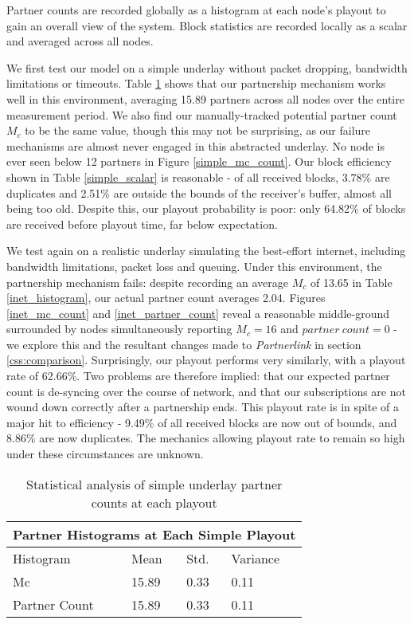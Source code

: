 \documentclass[12pt,a4paper]{article}
\begin{document}
Partner counts are recorded globally as a histogram at each node's playout to gain an overall view of the system. Block statistics are recorded locally as a scalar and averaged across all nodes.

We first test our model on a simple underlay without packet dropping, bandwidth limitations or timeouts. Table \ref{simple_histogram} shows that our partnership mechanism works well in this environment, averaging 15.89 partners across all nodes over the entire measurement period. We also find our manually-tracked potential partner count \(M_c\) to be the same value, though this may not be surprising, as our failure mechanisms are almost never engaged in this abstracted underlay. No node is ever seen below 12 partners in Figure \ref{simple_mc_count}. Our block efficiency shown in Table \ref{simple_scalar} is reasonable - of all received blocks, 3.78\% are duplicates and 2.51\% are outside the bounds of the receiver's buffer, almost all being too old. Despite this, our playout probability is poor: only 64.82\% of blocks are received before playout time, far below expectation.

We test again on a realistic underlay simulating the best-effort internet, including bandwidth limitations, packet loss and queuing. Under this environment, the partnership mechanism fails: despite recording an average \(M_c\) of 13.65 in Table \ref{inet_histogram}, our actual partner count averages 2.04. Figures \ref{inet_mc_count} and \ref{inet_partner_count} reveal a reasonable middle-ground surrounded by nodes simultaneously reporting \(M_c = 16\) and \(partner\ count = 0\) - we explore this and the resultant changes made to \textit{Partnerlink} in section \ref{css:comparison}. Surprisingly, our playout performs very similarly, with a playout rate of 62.66\%. Two problems are therefore implied: that our expected partner count is de-syncing over the course of network, and that our subscriptions are not wound down correctly after a partnership ends. This playout rate is in spite of a major hit to efficiency - 9.49\% of all received blocks are now out of bounds, and 8.86\% are now duplicates. The mechanics allowing playout rate to remain so high under these circumstances are unknown.

\begin{table}[h!]
	\centering
	\begin{tabular}{ |p{3cm}||p{3cm}|p{3cm}|p{3cm}|  }
		\hline
		\multicolumn{4}{|c|}{Partner Histograms at Each Simple Playout} \\
		\hline
		Histogram & Mean & Std. & Variance \\
		\hline
		Mc   & 15.89    & 0.33 &   0.11\\
		Partner Count &   15.89  & 0.33   & 0.11\\
		\hline
	\end{tabular} 
	\caption{Statistical analysis of simple underlay partner counts at each playout}
	\label{simple_histogram}
\end{table}
\end{document}
